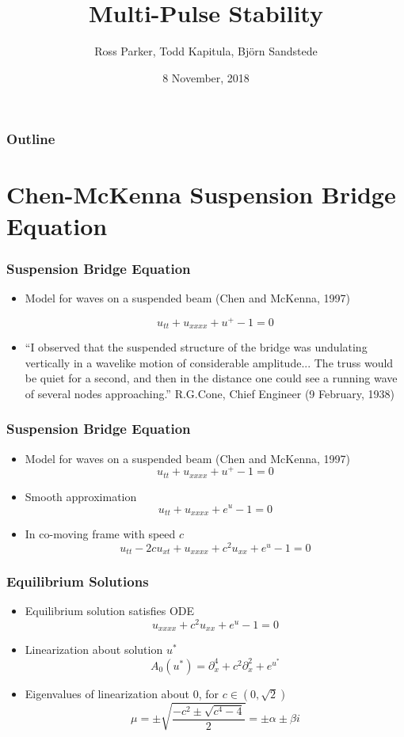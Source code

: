 \documentclass[16pt]{beamer}
\title[Spectral Stability of Multi-Pulses via the Krein Matrix]{Multi-Pulse Stability}
\author[R. Parker]{Ross Parker, Todd Kapitula, Bj{\"o}rn Sandstede}
\date{8 November, 2018}
\begin{document}
 
\frame{\titlepage}
 
\begin{frame}
\frametitle{Outline}
\tableofcontents
\end{frame}

\section{Chen-McKenna Suspension Bridge Equation}

\begin{frame}
	\frametitle{Suspension Bridge Equation}
	\begin{itemize}   
		\item Model for waves on a suspended beam (Chen and McKenna, 1997)

     	\[ u_{tt} + u_{xxxx} + u^+ - 1 = 0 \]

		\item ``I observed that the suspended structure of the bridge was undulating vertically in a wavelike motion of considerable amplitude... The truss would be quiet for a second, and then in the distance one could see a running wave of several nodes approaching.'' \textendash \: R.G.Cone, Chief Engineer (9 February, 1938)
	\end{itemize}
\end{frame}

\begin{frame}
	\frametitle{Suspension Bridge Equation}   
	\begin{itemize}
		\item Model for waves on a suspended beam (Chen and McKenna, 1997)
            \[ u_{tt} + u_{xxxx} + u^+ - 1 = 0 \]
        \item Smooth approximation
            \[ u_{tt} + u_{xxxx} + e^{u} - 1 = 0 \]
        \item In co-moving frame with speed $c$
            \[ u_{tt} - 2 c u_{x t} + u_{xxxx} + c^2 u_{xx} + e^{u} - 1 = 0 \]
	\end{itemize}
\end{frame}

\begin{frame}
	\frametitle{Equilibrium Solutions}   
	\begin{itemize}
		\item Equilibrium solution satisfies ODE
            \[ u_{xxxx} + c^2 u_{xx} + e^{u} - 1 = 0 \]
        \item Linearization about solution $u^*$
            \[ A_0(u^*) = \partial_x^4 + c^2 \partial_x^2 + e^{u^*} \]
        \item Eigenvalues of linearization about 0, for $c \in (0, \sqrt{2})$
            \[ \mu = \pm \sqrt{\frac{-c^2 \pm \sqrt{c^4 - 4}}{2} } = \pm \alpha \pm \beta i \]
	\end{itemize}
\end{frame}
\end{document}
